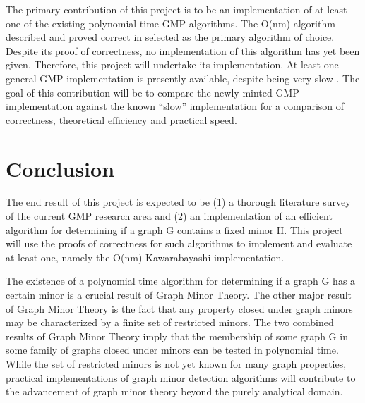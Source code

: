 \documentclass[12pt,conference]{IEEEtran}
\begin{document}
The primary contribution of this project is to be an implementation of at least one of the existing polynomial time GMP algorithms. The O(nm) algorithm described and proved correct in \cite{kawarabayashi-nm} selected as the primary algorithm of choice. Despite its proof of correctness, no implementation of this algorithm has yet been given. Therefore, this project will undertake its implementation. At least one general GMP implementation is presently available, despite being very slow \cite{sage-graph-minor}. The goal of this contribution will be to compare the newly minted GMP implementation against the known ``slow'' implementation for a comparison of correctness, theoretical efficiency and practical speed.

\section{Conclusion}

The end result of this project is expected to be (1) a thorough literature survey of the current GMP research area and (2) an implementation of an efficient algorithm for determining if a graph G contains a fixed minor H. This project will use the proofs of correctness for such algorithms to implement and evaluate at least one, namely the O(nm) Kawarabayashi implementation.

The existence of a polynomial time algorithm for determining if a graph G has a certain minor is a crucial result of Graph Minor Theory. The other major result of Graph Minor Theory is the fact that any property closed under graph minors may be characterized by a finite set of restricted minors. The two combined results of Graph Minor Theory imply that the membership of some graph G in some family of graphs closed under minors can be tested in polynomial time. While the set of restricted minors is not yet known for many graph properties, practical implementations of graph minor detection algorithms will contribute to the advancement of graph minor theory beyond the purely analytical domain.
\end{document}
